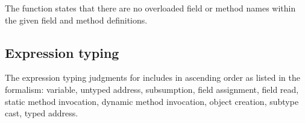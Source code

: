 \documentclass[acmlarge, anonymous, authordraft, review]{acmart} %
\begin{document}
The  function states that there are no overloaded 
field or method names within the given field and method definitions. \\

\vspace{-3mm}
\begin{mathpar}

\end{mathpar}

\vspace{-3mm}
\begin{mathpar}
\end{mathpar}
 
\vspace{-3mm}
\begin{mathpar}

\end{mathpar}

\begin{mathpar}
\end{mathpar}

\subsection{Expression typing}

The expression typing judgments for \kafka includes in ascending order as listed in the formalism:
variable, untyped address, subsumption, field assignment, field read, static method invocation, dynamic method invocation, object creation,
subtype cast, typed address.
\end{document}
